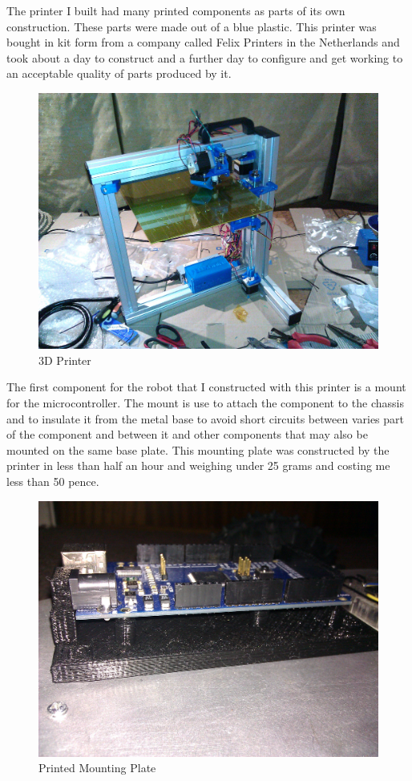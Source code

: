 The printer I built had many printed components as parts of its own construction.  These parts were made out of a blue plastic. This printer was bought in kit form from a company called Felix Printers\cite{felix} in the Netherlands and took about a day to construct and a further day to configure and get working to an acceptable quality of parts produced by it.
\begin{figure}[H]
\centering
        \includegraphics[width=5.0in]  {Images/printer.jpg}
        \caption{3D Printer}
        \label{3D Printer}
\end{figure}
The first component for the robot that I constructed with this printer is a mount for the microcontroller.  The mount is use to attach the component to the chassis and to insulate it from the metal base to avoid short circuits between varies part of the component and between it and other components that may also be mounted on the same base plate.  This mounting plate was constructed by the printer in less than half an hour and weighing under 25 grams and costing me less than 50 pence.
\begin{figure}[H]
\centering
        \includegraphics[width=5.0in]  {Images/printed-mount.jpg}
        \caption{Printed Mounting Plate}
        \label{Printed Mounting Plate}
\end{figure}
